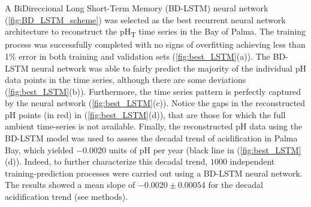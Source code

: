 A BiDireccional Long Short-Term Memory (BD-LSTM) neural network
(\cref{fig:BD_LSTM_scheme}) was selected as the best recurrent neural network
architecture to reconstruct the pH\textsubscript{T} time series in the Bay of
Palma. The training process was successfully completed with no signs of
overfitting achieving less than 1\% error in both training and validation sets
(\cref{fig:best_LSTM}(a)). The BD-LSTM neural network was able to fairly
predict the majority of the individual pH data points in the time series,
although there are some deviations (\cref{fig:best_LSTM}(b)). Furthermore, the
time series pattern is perfectly captured by the neural network
(\cref{fig:best_LSTM}(c)). Notice the gaps in the reconstructed pH points (in
red) in (\cref{fig:best_LSTM}(d)), that are those for which the full ambient
time-series is not available. Finally, the reconstructed pH data using the
BD-LSTM model was used to assess the decadal trend of acidification in Palma
Bay, which yielded $-0.0020$ units of pH per year (black line in
(\cref{fig:best_LSTM}(d)). Indeed, to further characterize this decadal trend,
$1000$ independent training-prediction processes were carried out using a
BD-LSTM neural network. The results showed a mean slope of  $-0.0020 \pm
    0.00054$ for the decadal acidification trend (see methods).

